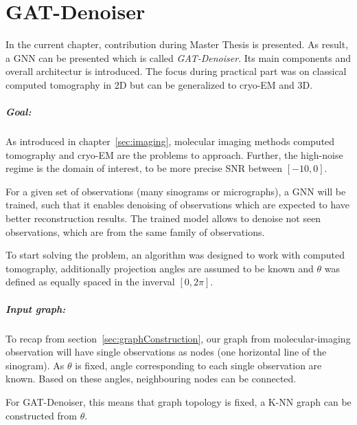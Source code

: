 \chapter{GAT-Denoiser}
\label{sec:contribution}

In the current chapter, contribution during Master Thesis is presented.
As result, a GNN can be presented which is called \textit{GAT-Denoiser}.
Its main components and overall architectur is introduced.
The focus during practical part was on classical computed tomography in 2D but
can be generalized to cryo-EM and 3D.

\paragraph{Goal:}
As introduced in chapter~\ref{sec:imaging}, molecular imaging methods computed tomography and cryo-EM are the problems
to approach. Further, the high-noise regime is the domain of interest, to be more precise SNR between $[-10, 0]$.

For a given set of observations (many sinograms or micrographs), a GNN will be trained, such that
it enables denoising of observations which are expected to have better reconstruction results.
The trained model allows to denoise not seen observations, which are from the same family of observations.


\begin{tcolorbox}[colback=red!5!white,colframe=red!75!black]
  To start solving the problem, an algorithm was designed to work with computed tomography, additionally
  projection angles are assumed to be known and $\theta$ was defined as equally spaced 
  in the inverval $[0, 2 \pi]$. 
\end{tcolorbox}

\paragraph{Input graph:}
To recap from section~\ref{sec:graphConstruction}, our graph from molecular-imaging observation
will have single observations as nodes (one horizontal line of the sinogram). 
As $\theta$ is fixed, angle corresponding to each single observation are known. 
Based on these angles, neighbouring nodes can be connected.

\begin{tcolorbox}[colback=red!5!white,colframe=red!75!black]
  For GAT-Denoiser, this means that graph topology is fixed,
  a K-NN graph can be constructed from $\theta$.
\end{tcolorbox}


